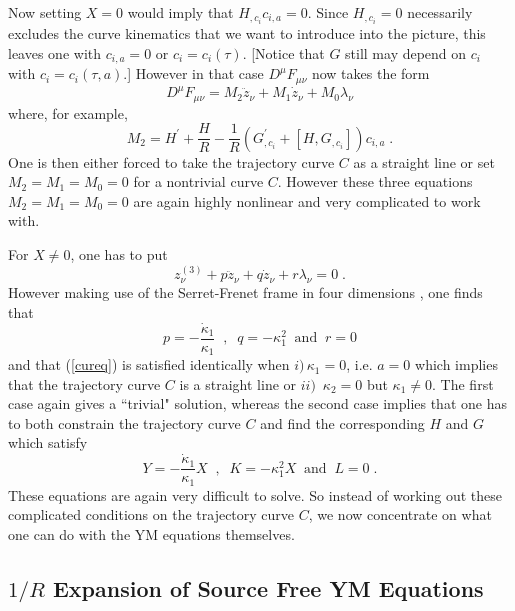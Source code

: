 \documentclass[a4paper,twocolumn,prd,showpacs,amsmath,amssymb]{revtex4}
\begin{document}
Now setting $X=0$ would imply that $H_{,c_{i}} c_{i,a} = 0$. Since $H_{,c_{i}}=0$
necessarily excludes the curve kinematics that we want to introduce into the picture,
this leaves one with $c_{i,a} =0$ or $c_{i} = c_{i}(\tau)$. [Notice that $G$ still
may depend on $c_{i}$ with $c_{i}=c_{i}(\tau,a)$.] However in that case
$D^{\mu} F_{\mu\nu}$ now takes the form
\[ D^{\mu} F_{\mu\nu} = M_{2} \ddot{z}_{\nu} + M_{1} \dot{z}_{\nu} + M_{0} \lambda_{\nu} \]
where, for example,
\[ M_2 = H^{\prime} + \frac{H}{R} - \frac{1}{R}
(G^{\prime}_{,c_{i}} + [H,G_{,c_{i}}]) c_{i,a} \; . \]
One is then either forced to take the trajectory curve $C$ as a straight line or
set $M_{2}=M_{1}=M_{0}=0$ for a nontrivial curve $C$. However these three equations
$M_{2}=M_{1}=M_{0}=0$ are again highly nonlinear and very complicated to work with.

For $X \neq 0$, one has to put
\begin{equation}
z^{(3)}_{\nu} + p \ddot{z}_{\nu} + q \dot{z}_{\nu} + r \lambda_{\nu} = 0 \; .
\label{cureq}
\end{equation}
However making use of the Serret-Frenet frame in four dimensions \cite{gs1}, one finds
that
\[ p = - \frac{\dot{\kappa}_{1}}{\kappa_{1}} \;\; , \;\; q = - \kappa_{1}^2
\;\; \mbox{and} \;\; r=0 \]
and that (\ref{cureq}) is satisfied identically when $i) \, \kappa_{1}=0$, i.e. $a=0$
which implies that the trajectory curve $C$ is a straight line or $ii) \,$
$\kappa_{2}=0$ but $\kappa_{1} \neq 0$. The first case again gives a
``trivial" solution, whereas the second case implies that one has to both constrain
the trajectory curve $C$ and find the corresponding $H$ and $G$ which satisfy
\[ Y = - \frac{\dot{\kappa}_{1}}{\kappa_{1}} X \;\; , \;\; K = - \kappa_{1}^2 X
\;\; \mbox{and} \;\; L=0 \; .\]
These equations are again very difficult to solve. So instead of working out
these complicated conditions on the trajectory curve $C$, we now concentrate on
what one can do with the YM equations themselves.

\subsection{\label{asymym} $1/R$ Expansion of Source Free YM Equations}
\end{document}
